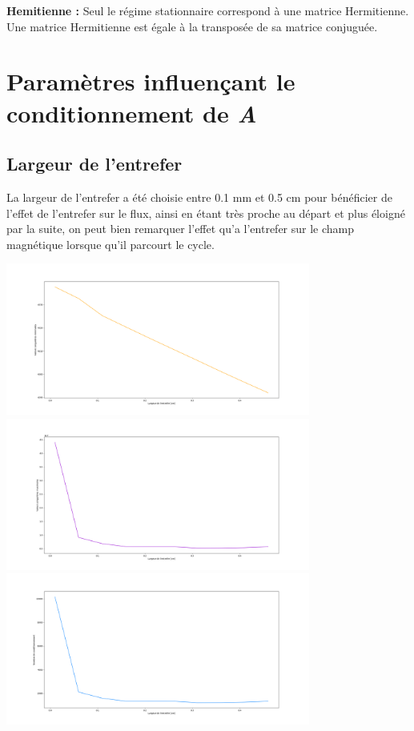 \documentclass{article}[11pt]
\begin{document}
\textbf{Hemitienne :}
Seul le régime stationnaire correspond à une matrice Hermitienne. Une matrice Hermitienne est égale à la transposée de sa matrice conjuguée.

\section{Paramètres influençant le conditionnement de \textit{A}}
\subsection{Largeur de l'entrefer}
La largeur de l'entrefer a été choisie entre 0.1 mm et 0.5 cm pour bénéficier de l'effet de l'entrefer sur le flux, ainsi en étant très proche au départ et plus éloigné par la suite, on peut bien remarquer l'effet qu'a l'entrefer sur le champ magnétique lorsque qu'il parcourt le cycle.
\begin{center}
    \includegraphics[width = 10cm]{influences/plots/gap_min.png}
    \includegraphics[width = 10cm]{influences/plots/gap_max.png}
    \includegraphics[width = 10cm]{influences/plots/gap_k.png}
\end{center}
\end{document}
